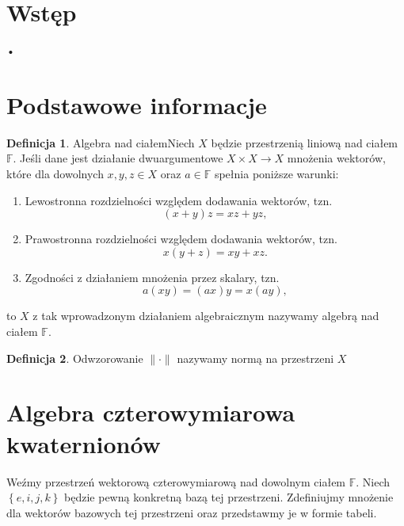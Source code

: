 \documentclass[a4paper,twoside,11pt,reqno]{mwrep}
\newcommand\blankpage{%
    \null
    \thispagestyle{empty}%
    \addtocounter{page}{-1}%
    \newpage}
\theoremstyle{plain} \newtheorem{twr}{Twierdzenie}
\theoremstyle{plain} \newtheorem{lem}{Lemat}
\theoremstyle{definition} \newtheorem{defi}{Definicja}
\theoremstyle{remark} \newtheorem*{wni}{Wniosek}
\theoremstyle{definition} \newtheorem{uwaga}{Uwaga}
\theoremstyle{definition}\newtheorem{prz}{Przykład}
\begin{document}
\tableofcontents
\clearpage
\blankpage

\chapter*{Wstęp}
•
\chapter*{Podstawowe informacje}
\begin{defi}{Algebra nad ciałem}\label{defAlgebry}
Niech $X$ będzie przestrzenią liniową nad ciałem $\mathbb{F}$. Jeśli dane jest działanie dwuargumentowe 
$X\times X \rightarrow X$ mnożenia wektorów, które dla dowolnych $x,y,z\in X$ oraz $a\in\mathbb{F}$ spełnia poniższe warunki:
\begin{enumerate}
\item Lewostronna rozdzielności względem dodawania wektorów, tzn.
$$(x+y)z=xz+yz,$$
\item Prawostronna rozdzielności względem dodawania wektorów, tzn.
$$x(y+z)=xy+xz.$$
\item Zgodności z działaniem mnożenia przez skalary, tzn.
$$a(xy)=(ax)y=x(ay),$$
\end{enumerate}
to $X$ z tak wprowadzonym działaniem algebraicznym nazywamy algebrą nad ciałem $\mathbb{F}$.
\end{defi} 

\begin{defi}
Odwzorowanie
$\|\cdot \|$ nazywamy normą na przestrzeni $X$
\end{defi}

\chapter{Algebra czterowymiarowa kwaternionów}
Weźmy przestrzeń wektorową czterowymiarową nad dowolnym ciałem $\mathbb{F}$.
Niech $\left\{ e,i,j,k \right\}$ będzie pewną konkretną bazą tej przestrzeni.
Zdefiniujmy mnożenie dla wektorów bazowych tej przestrzeni oraz przedstawmy je w formie tabeli.\\
\end{document}
